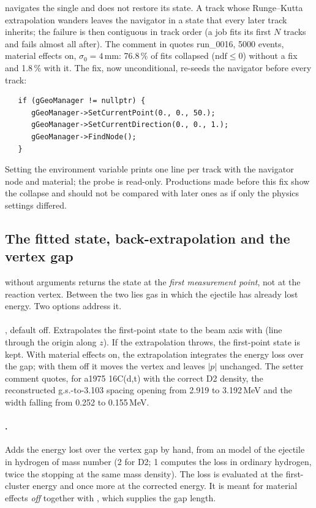  navigates the single  and does not restore its state. A track whose
Runge--Kutta extrapolation wanders leaves the navigator in a state that every later track inherits; the failure is
then contiguous in track order (a job fits its first $N$ tracks and fails almost all after). The comment in
 quotes run\_0016, 5000 events, material effects on, $\sigma_0=4$\,mm: 76.8\,\% of fits
collapsed ($\mathrm{ndf}\le0$) without a fix and 1.8\,\% with it. The fix, now unconditional, re-seeds the navigator
before every track:
\begin{verbatim}
   if (gGeoManager != nullptr) {
      gGeoManager->SetCurrentPoint(0., 0., 50.);
      gGeoManager->SetCurrentDirection(0., 0., 1.);
      gGeoManager->FindNode();
   }
\end{verbatim}
Setting the environment variable  prints one line per track with the navigator node and
material; the probe is read-only. Productions made before this fix show the collapse and should not be compared with
later ones as if only the physics settings differed.

\subsection{The fitted state, back-extrapolation and the vertex gap}
\label{sec:gf-xtr}

 without arguments returns the state at the \emph{first measurement point}, not
at the reaction vertex. Between the two lies gas in which the ejectile has already lost energy. Two options address it.

\paragraph{}, default off. Extrapolates the first-point state to the beam axis with
 (line through the origin along $z$). If the extrapolation throws, the
first-point state is kept. With material effects on, the extrapolation integrates the energy loss over the gap; with
them off it moves the vertex and leaves $|p|$ unchanged. The setter comment quotes, for a1975 16C(d,t) with the correct
D2 density, the reconstructed g.s.-to-3.103 spacing opening from 2.919 to 3.192\,MeV and the width falling from 0.252
to 0.155\,MeV.

\paragraph{.} Adds the energy lost over the vertex gap by hand, from an
 model of the ejectile in hydrogen of mass number  (2 for D2; 1 computes the loss in
ordinary hydrogen, twice the stopping at the same mass density). The loss is evaluated at the first-cluster energy and
once more at the corrected energy. It is meant for material effects \emph{off} together with
, which supplies the gap length.

